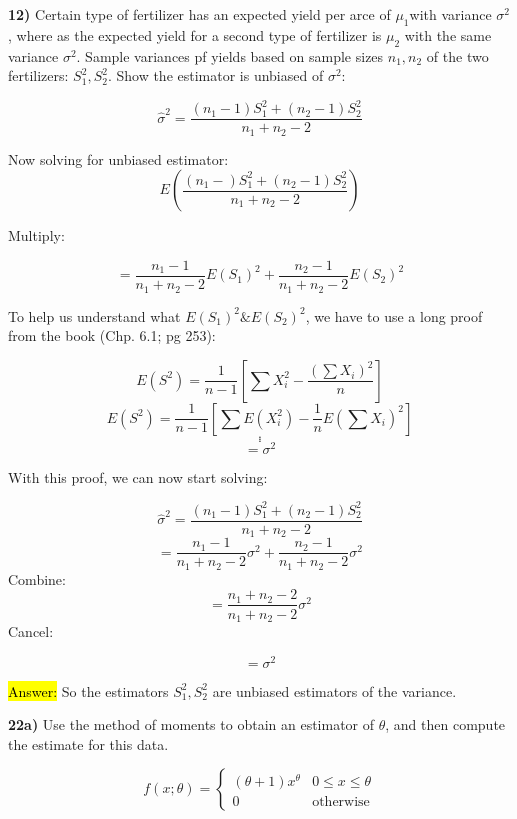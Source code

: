 \documentclass{article}
\begin{document}

\vspace{3mm}
\newpage

\textbf{12)} Certain type of fertilizer has an expected yield per arce of $\mu_{1}$with variance $\sigma^{2}$, where as the expected yield for a second type of fertilizer is $\mu_{2}$ with the same variance $\sigma^{2}$. Sample variances pf yields based on sample sizes $n_{1}, n_{2}$ of the two fertilizers: $S_{1}^{2}, S_{2}^{2}$. Show the estimator is unbiased of $\sigma^{2}$:

$$\hat{\sigma}^{2}=\frac{(n_{1} -1)S_{1}^{2}+(n_{2} - 1)S_{2}^{2}}{n_{1}+n_{2} -2}$$

Now solving for unbiased estimator:
$$E(\frac{(n_{1}-)S_{1}^{2} + (n_{2} - 1)S_{2}^{2}}{n_{1} + n_{2} -2})$$

Multiply:

$$=\frac{n_{1}-1} {n_{1} + n_{2} -2}E(S_{1})^{2} +\frac{n_{2}-1} {n_{1} + n_{2} -2}E(S_{2})^{2}$$

To help us understand what $E(S_{1})^{2} \& E(S_{2})^{2}$, we have to use a long proof from the book (Chp. 6.1; pg 253):

$$E(S^{2})=\frac{1}{n-1}[\sum X_{i}^{2}-\frac{(\sum X_{i})^{2}}{n}]$$
$$E(S^{2})=\frac{1}{n-1}[\sum E(X_{i}^{2})-\frac{1}{n}E(\sum X_{i})^{2}]$$
$$ . $$
$$ . $$
$$ . $$
$$=\sigma^{2}$$

With this proof, we can now start solving: 

$$\hat{\sigma}^{2}=\frac{(n_{1} -1)S_{1}^{2}+(n_{2} - 1)S_{2}^{2}}{n_{1}+n_{2} -2}$$
$$=\frac{n_{1}-1} {n_{1} + n_{2} -2}\sigma^{2} +\frac{n_{2}-1} {n_{1} + n_{2} -2}\sigma^{2}$$
Combine:
$$=\frac{n_{1}+n_{2}-2} {n_{1} + n_{2} -2}\sigma^{2}$$
Cancel:

$$=\sigma^{2}$$


\hl{Answer:}
So the estimators $S_{1}^{2}, S_{2}^{2}$ are unbiased estimators of the variance.




\newpage

\textbf{22a)}  Use the method of moments to obtain an estimator of $\theta$, and then compute the estimate for this data.

\vspace{2mm}
 $$f(x ; \theta)=
\begin{cases}
 (\theta+1)x^\theta & 0\le x \le \theta \\
 0 & \text{otherwise} 
\end{cases}$$ 
\end{document}

